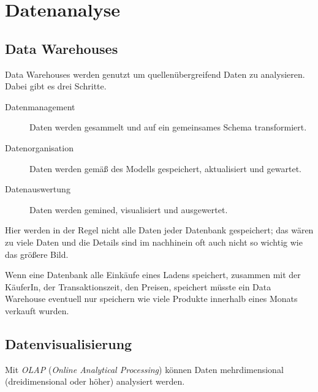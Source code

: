 \documentclass{article}
\begin{document}
\section{Datenanalyse}
\subsection{Data Warehouses}
Data Warehouses werden genutzt um quellenübergreifend Daten zu analysieren. Dabei gibt es drei Schritte.
\begin{description}
 \item[Datenmanagement] Daten werden gesammelt und auf ein gemeinsames Schema transformiert.
 \item[Datenorganisation] Daten werden gemäß des Modells gespeichert, aktualisiert und gewartet.
 \item[Datenauswertung] Daten werden gemined, visualisiert und ausgewertet.
\end{description}
Hier werden in der Regel nicht alle Daten jeder Datenbank gespeichert; das wären zu viele Daten und die Details sind im nachhinein oft auch nicht so wichtig wie das größere Bild.
\begin{zexample}
Wenn eine Datenbank alle Einkäufe eines Ladens speichert, zusammen mit der KäuferIn, der Transaktionszeit, den Preisen, \etc speichert müsste ein Data Warehouse eventuell nur speichern wie viele Produkte innerhalb eines Monats verkauft wurden.
\end{zexample}

\subsection{Datenvisualisierung}
Mit \emph{OLAP} (\emph{Online Analytical Processing}) können Daten mehrdimensional (dreidimensional oder höher) analysiert werden.
\end{document}
